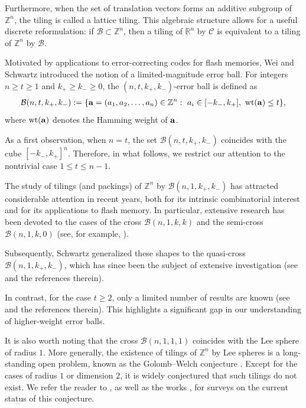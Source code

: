 \documentclass[12pt]{article}
\begin{document}
Furthermore, when the set of translation vectors forms an additive subgroup of $\mathbb{Z}^n$, the tiling is called a lattice tiling. This algebraic structure allows for a useful discrete reformulation: if $\mathcal{B}\subset\mathbb{Z}^n$, then a tiling of $\mathbb{R}^n$ by $\mathcal{C}$ is equivalent to a tiling of $\mathbb{Z}^n$ by $\mathcal{B}$.

Motivated by applications to error-correcting codes for flash memories, Wei and Schwartz \cite{WS22} introduced the notion of a limited-magnitude error ball. For integers $n\ge t\ge1$ and $k_{+}\ge k_{-}\ge0$, the $(n,t,k_{+},k_{-})$-error ball is defined as
\begin{align*}
\mathcal{B}(n,t,k_{+},k_{-})
:=\{{\bf a}=(a_1,a_2,\dots,a_n)\in\mathbb{Z}^n:\ a_i\in[-k_{-},k_{+}],\ \mathrm{wt}({\bf a})\le t\},
\end{align*}
where $\mathrm{wt}({\bf a})$ denotes the Hamming weight of ${\bf a}$.

As a first observation, when $n=t$, the set $\mathcal{B}(n,t,k_{+},k_{-})$ coincides with the cube $[-k_{-},k_{+}]^n$. Therefore, in what follows, we restrict our attention to the nontrivial case $1\le t\le n-1$.

The study of tilings (and packings) of $\mathbb{Z}^n$ by $\mathcal{B}(n,1,k_{+},k_{-})$ has attracted considerable attention in recent years, both for its intrinsic combinatorial interest and for its applications to flash memory. In particular, extensive research has been devoted to the cases of the cross $\mathcal{B}(n,1,k,k)$ and the semi-cross $\mathcal{B}(n,1,k,0)$ (see, for example, \cite{GS81,HS1974,HS1984,HS1986,KBE11,KLNY11,KLY12,S67,S1984,SS1994,S86,S87,T98,W1995}).

Subsequently, Schwartz \cite{S12} generalized these shapes to the quasi-cross $\mathcal{B}(n,1,k_{+},k_{-})$, which has since been the subject of extensive investigation (see \cite{S14,XL20,XL21,YKB13,YZZG20,ZG16,ZG18,ZZG17} and the references therein).

In contrast, for the case $t\ge2$, only a limited number of results are known (see \cite{BE13,GWX25,KLNY11,LTWZ25,S90,ZLG2023} and the references therein). This highlights a significant gap in our understanding of higher-weight error balls.

It is also worth noting that the cross $\mathcal{B}(n,1,1,1)$ coincides with the Lee sphere of radius $1$. More generally, the existence of tilings of $\mathbb{Z}^n$ by Lee spheres is a long-standing open problem, known as the Golomb–Welch conjecture \cite{GW1970}. Except for the cases of radius $1$ or dimension $2$, it is widely conjectured that such tilings do not exist. We refer the reader to \cite{E2011,H2009,H2009-2,HA2012,LZ2020,P1975,ZG2017,ZG2024,ZZ2019}, as well as the  works \cite{E22,HK2018}, for surveys on the current status of this conjecture.
\end{document}
